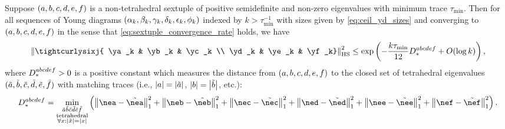 \documentclass[notitlepage, 10pt]{article}
\begin{document}
\begin{cor}
    Suppose $(a, b, c, d, e, f)$ is a non-tetrahedral sextuple of positive semidefinite and non-zero eigenvalues with minimum trace $\tau_{\min}$.
    Then for all sequences of Young diagrams $(\alpha_k, \beta_k, \gamma_k, \delta_k, \epsilon_k, \phi_k)$ indexed by $k > \tau_{\min}^{-1}$ with sizes given by \cref{eq:ceil_yd_sizes} and converging to $(a,b,c,d,e,f)$ in the sense that \cref{eq:sextuple_convergence_rate} holds, we have 
    \begin{equation}
        \label{eq:seq_ud_sixj_upper_bound}
        \norm{\tightcurlysixj{ \ya_k & \yb_k & \yc_k \\ \yd_k &  \ye_k &  \yf_k}}_{\mathrm{HS}}^{2}
        \leq \exp\left(- \frac{k \tau_{\min}}{12} D_{*}^{\ea\eb\ec\ed\ee\ef} + O(\log k)\right),
    \end{equation}
    where $D_{*}^{abcdef} > 0$ is a positive constant which measures the distance from $(a, b, c, d, e, f)$ to the closed set of tetrahedral eigenvalues $(\tilde {a}, \tilde {b}, \tilde {c}, \tilde {d}, \tilde {e}, \tilde {f})$ with matching traces (i.e., $\left|a\right|=\left|\tilde {a}\right|$, $\left|b\right|=\left|\tilde {b}\right|$, etc.):
    \begin{equation}
        D_{*}^{\ea\eb\ec\ed\ee\ef} =
        \min_{\substack{\tilde \ea \tilde \eb \tilde \ec\tilde\ed \tilde \ee \tilde \ef\\\mathrm{tetrahedral}\\\forall \ex : \abs{\tilde \ex}=\abs{\ex}}}
        \left( 
        \norm{\nea - \tilde{\nea}}_{1}^{2} +
        \norm{\neb - \tilde{\neb}}_{1}^{2} +
        \norm{\nec - \tilde{\nec}}_{1}^{2} +
        \norm{\ned - \tilde{\ned}}_{1}^{2} +
        \norm{\nee - \tilde{\nee}}_{1}^{2} +
        \norm{\nef - \tilde{\nef}}_{1}^{2}
        \right)
        .
    \end{equation}
\end{cor}
\end{document}
